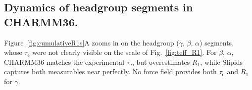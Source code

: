 \documentclass[journal=jcisd8,manuscript=article,layout=twocolumn]{achemso}
\begin{document}

\subsection*{Dynamics of headgroup segments in CHARMM36.}

Figure~\ref{fig:cumulativeR1s}A zooms in on the headgroup ($\gamma$, $\beta$, $\alpha$) segments,
whose $\tau_\mathrm e$ were not clearly visible on the scale of Fig.~\ref{fig:teff_R1}.
%
For $\beta$, $\alpha$, CHARMM36 matches the experimental $\tau_\mathrm e$,
but overestimates $R_1$, while Slipids captures both measurables near perfectly.  
%
No force field provides both $\tau_\mathrm e$ and $R_1$ for $\gamma$.
\end{document}

